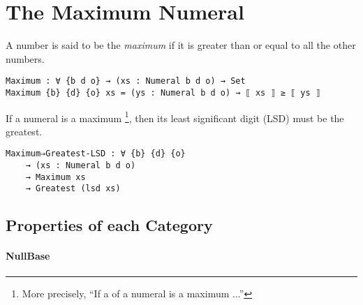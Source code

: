 \documentclass[\main/thesis.tex]{subfiles}
\begin{document}
\section{The Maximum Numeral}\label{maximum}

A number is said to be the \textit{maximum} if it is greater than or equal
to all the other numbers.

\begin{lstlisting}
Maximum : ∀ {b d o} → (xs : Numeral b d o) → Set
Maximum {b} {d} {o} xs = (ys : Numeral b d o) → ⟦ xs ⟧ ≥ ⟦ ys ⟧
\end{lstlisting}

If a numeral is a maximum
\footnote{More precisely, ``If a  of a numeral is a maximum ...''},
then its least significant digit (LSD) must be the greatest.

\begin{lstlisting}
Maximum⇒Greatest-LSD : ∀ {b} {d} {o}
    → (xs : Numeral b d o)
    → Maximum xs
    → Greatest (lsd xs)
\end{lstlisting}



\subsection{Properties of each Category}

\paragraph{NullBase}

\begin{center}
    \begin{adjustbox}{max width=\textwidth}
    \end{adjustbox}
\end{center}
\end{document}
